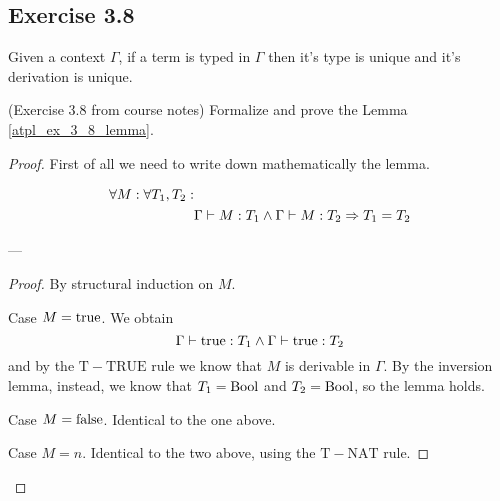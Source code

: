 \documentclass[12pt,a4paper,oneside]{book}
\begin{document}
\subsection{Exercise 3.8}

\begin{lemma}
    \label{atpl_ex_3_8_lemma}
    Given a context $\Gamma$, if a term is typed in $\Gamma$ then
    it's type is unique and it's derivation is unique.
\end{lemma}

\begin{exercise}(Exercise 3.8 from course notes)
    Formalize and prove the Lemma \ref{atpl_ex_3_8_lemma}.

    \begin{proof}
        First of all we need to write down mathematically the lemma.

        \begin{equation*}
        \begin{split}
        \forall M \mathrel{:} \forall T_1, T_2 \mathrel{:} & \\ 
        & \Gamma \vdash M : T_1 \land \Gamma \vdash M : T_2 \Rightarrow T_1 = T_2
        \end{split}
        \end{equation*}
        
        ---
        
        \begin{proof}
        	By structural induction on $M$.
        	
        	Case $M = \mathrm{true}$. We obtain
        	\[
        	\Gamma \vdash \mathrm{true} : T_1 \land \Gamma \vdash \mathrm{true} : T_2
        	\]
        	and by the $\mathrm{T-TRUE}$ rule we know that $M$ is
        	derivable in $\Gamma$. By the inversion lemma, instead, we
        	know that $T_1 = \mathrm{Bool}$ and $T_2 = \mathrm{Bool}$, so the lemma
        	holds.
        	
        	Case $M = \mathrm{false}$. Identical to the one above.
        	
        	Case $M = n$. Identical to the two above, using the
        	$\mathrm{T-NAT}$ rule.
        	

\end{proof}
\end{proof}
\end{exercise}
\end{document}
